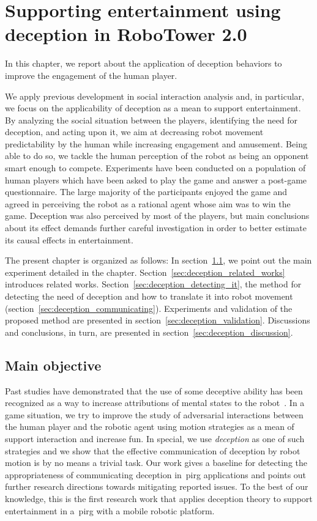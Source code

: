 \chapter{Supporting entertainment using deception in RoboTower 2.0}\label{ch:deception}

In this chapter, we report about the application of deception behaviors to improve the engagement of the human player.

We apply previous development in social interaction analysis and, in particular, we focus on the applicability of deception as a mean to support entertainment. By analyzing the social situation between the players, identifying the need for deception, and acting upon it, we aim at decreasing robot movement predictability by the human while increasing engagement and amusement. Being able to do so, we tackle the human perception of the robot as being an opponent smart enough to compete. Experiments have been conducted on a population of human players which have been asked to play the game and answer a post-game questionnaire. The large majority of the participants enjoyed the game and agreed in perceiving the robot as a rational agent whose aim was to win the game. Deception was also perceived by most of the players, but main conclusions about its effect demands further careful investigation in order to better estimate its causal effects in entertainment.

The present chapter is organized as follows: In section~\ref{sec:deception_main_objectives}, we point out the main experiment detailed in the chapter. Section~\ref{sec:deception_related_works} introduces related works. Section~\ref{sec:deception_detecting_it}, the method for detecting the need of deception and how to translate it into robot movement (section~\ref{sec:deception_communicating}).
Experiments and validation of the proposed method are presented in section~\ref{sec:deception_validation}. Discussions and conclusions, in turn, are presented in section~\ref{sec:deception_discussion}.

\section{Main objective} \label{sec:deception_main_objectives}

Past studies have demonstrated that the use of some deceptive ability has been recognized as a way to increase attributions of mental states to the robot~\citep{shim_taxonomy_2013}. In a game situation, we try to improve the study of adversarial interactions between the human player and the robotic agent using motion strategies as a mean of support interaction and increase fun. In special, we use \textit{deception} as one of such strategies and we show that the effective communication of deception by robot motion is by no means a trivial task. Our work gives a baseline for detecting the appropriateness of communicating deception in~\gls{pirg} applications and points out further research directions towards mitigating reported issues. To the best of our knowledge, this is the first research work that applies deception theory to support entertainment in a~\gls{pirg} with a mobile robotic platform.

